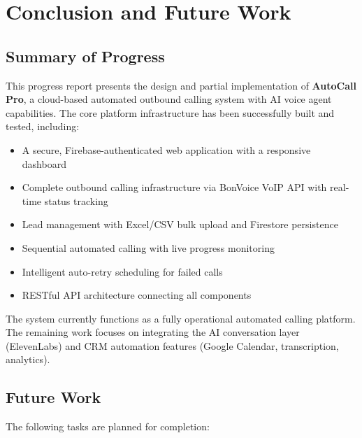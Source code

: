 \documentclass[12pt,a4paper,oneside]{book}
\begin{document}
\chapter{Conclusion and Future Work}

\section{Summary of Progress}

This progress report presents the design and partial implementation of \textbf{AutoCall Pro}, a cloud-based automated outbound calling system with AI voice agent capabilities. The core platform infrastructure has been successfully built and tested, including:

\begin{itemize}
    \item A secure, Firebase-authenticated web application with a responsive dashboard
    \item Complete outbound calling infrastructure via BonVoice VoIP API with real-time status tracking
    \item Lead management with Excel/CSV bulk upload and Firestore persistence
    \item Sequential automated calling with live progress monitoring
    \item Intelligent auto-retry scheduling for failed calls
    \item RESTful API architecture connecting all components
\end{itemize}

The system currently functions as a fully operational automated calling platform. The remaining work focuses on integrating the AI conversation layer (ElevenLabs) and CRM automation features (Google Calendar, transcription, analytics).

\section{Future Work}

The following tasks are planned for completion:
\end{document}
